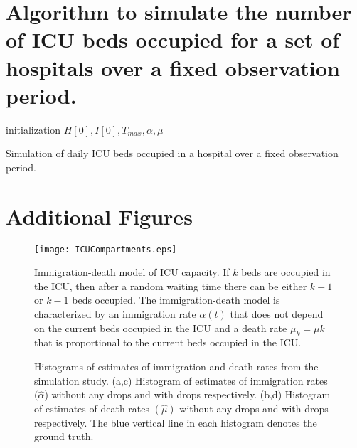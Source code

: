\documentclass{article}
\begin{document}
\begin{appendices}
\section{\textbf{Algorithm to simulate the number of ICU beds occupied for a set of hospitals over a fixed observation period.}}
\label{Appendix_2}
\begin{algorithm}
\SetAlgoLined
{}
 initialization $H[0], I[0], T_{max}, \alpha, \mu$\;
 \caption{Simulation of daily ICU beds occupied in a hospital over a fixed observation period.}
 \label{alg1}
\end{algorithm}

\section{Additional Figures}
\label{Appendix_3}
\setcounter{figure}{0}
\renewcommand{\thefigure}{\Alph{section}\arabic{figure}}

\begin{figure}[H]
    \centering
    \texttt{[image: ICUCompartments.eps]}
    \caption{Immigration-death model of ICU capacity. If $k$ beds are occupied in the ICU, then after a random waiting time there can be either $k+1$ or $k-1$ beds occupied. The immigration-death model is characterized by an immigration rate $\alpha(t)$ that does not depend on the current beds occupied in the ICU and a death rate $\mu_k = \mu k$ that is proportional to the current beds occupied in the ICU.}
    \label{fig:A1}
\end{figure}


\begin{figure}[H]
\centering
{}\hfil
{}

\hfil   
{}
\caption{Histograms of estimates of immigration and death rates from the simulation study. (a,c) Histogram of estimates of immigration rates $(\hat{\alpha}$) without any drops and with drops respectively. (b,d) Histogram of estimates of death rates $(\hat{\mu})$ without any drops and with drops respectively. The blue vertical line in each histogram denotes the ground truth.}
\label{fig:A2}
\end{figure}


\end{appendices}
\end{document}
